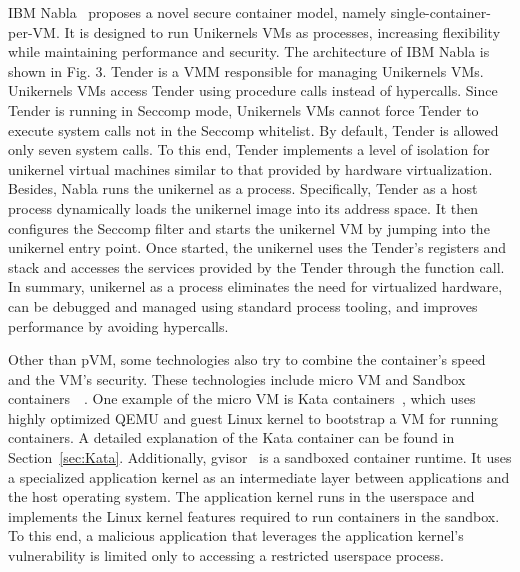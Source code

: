 IBM Nabla~\cite*{10.1145/3267809.3267845} proposes a novel secure container model, namely single-container-per-VM. It is designed to run Unikernels VMs as processes, increasing flexibility while maintaining performance and security. The architecture of IBM Nabla is shown in Fig. 3. Tender is a VMM responsible for managing Unikernels VMs. 
Unikernels VMs access Tender using procedure calls instead of hypercalls. Since Tender is running in Seccomp mode, Unikernels VMs cannot force Tender to execute system calls not in the Seccomp whitelist. By default, Tender is allowed only seven system calls. To this end, Tender implements a level 
of isolation for unikernel virtual machines similar to that provided by hardware virtualization. Besides, Nabla runs the unikernel as a process. Specifically, Tender as a host process dynamically loads the unikernel image into its address space. It then configures the Seccomp filter and starts the 
unikernel VM by jumping into the unikernel entry point. Once started, the unikernel uses the Tender's registers and stack and accesses the services provided by the Tender through the function call. In summary, unikernel as a process eliminates the need for virtualized hardware, can be debugged and 
managed using standard process tooling, and improves performance by avoiding hypercalls.


Other than pVM, some technologies also try to combine the container's speed and the VM's security. These technologies include micro VM and Sandbox containers~~\cite*{future_container}. One example of the micro VM is Kata containers~\cite*{Kata-Containers}, which uses highly optimized QEMU and guest Linux kernel to bootstrap a VM for running containers. 
A detailed explanation of the Kata container can be found in Section~\ref{sec:Kata}. Additionally, gvisor~\cite*{gvisor} is a sandboxed container runtime. It uses a specialized application kernel as an intermediate layer between applications and the host operating system. The application kernel runs in the userspace and 
implements the Linux kernel features required to run containers in the sandbox. To this end, a malicious application that leverages the application kernel's vulnerability is limited only to accessing a restricted userspace process.


